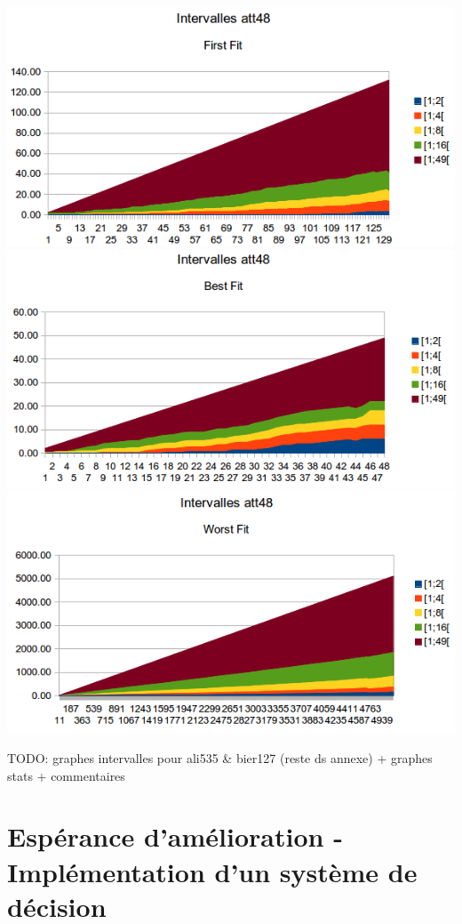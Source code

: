 \documentclass[a4paper,10pt]{report}
\begin{document}
\includegraphics[width=\textwidth]{images/att48-intervals-first-fit.png}
\includegraphics[width=\textwidth]{images/att48-intervals-best-fit.png}
\includegraphics[width=\textwidth]{images/att48-intervals-worst-fit.png}


TODO: graphes intervalles pour ali535 \& bier127 (reste ds annexe) + graphes stats + commentaires

\section{Espérance d'amélioration - Implémentation d'un système de décision}
\end{document}
